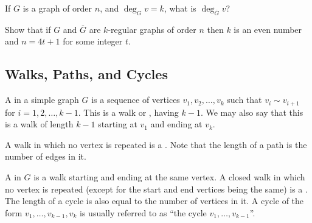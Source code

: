 \begin{Exercise}
If $G$ is a graph of order $n$, and $\deg_G v = k$, what is $\deg_{\overline G} v$?
\end{Exercise}

\begin{Exercise}
Show that if $G$ and $\overline G$ are $k$-regular graphs of order $n$ then $k$ is an even number and $n = 4t + 1$ for some integer $t$.
\end{Exercise}

\subsection{Walks, Paths, and Cycles}\label{subsec:Walks}

A  in a simple graph $G$ is a sequence of vertices $v_1, v_2, \ldots, v_k$ such that $v_i \sim v_{i + 1}$ for $i = 1, 2, \ldots, k - 1$. This is a walk  or , having  $k - 1$. We may also say that this is a walk of length $k - 1$ starting at $v_1$ and ending at $v_k$.

A walk in which no vertex is repeated is a . Note that the length of a path is the number of edges in it.

A  in $G$ is a walk starting and ending at the same vertex. A closed walk in which no vertex is repeated (except for the start and end vertices being the same) is a . The length of a cycle is also equal to the number of vertices in it. A cycle of the form $v_1, \ldots, v_{k-1}, v_k$ is usually referred to as ``the cycle $v_1, \ldots, v_{k-1}$''.

